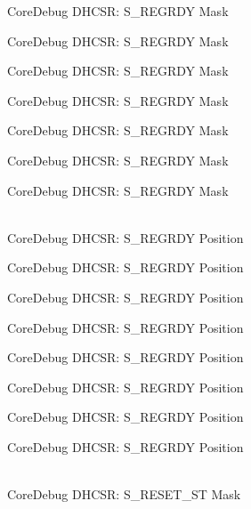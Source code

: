 \begin{DoxyRefList}
\label{deprecated__deprecated000120}%
%
Core\+Debug DHCSR:\+ S\+\_\+\+REGRDY Mask 

\label{deprecated__deprecated000174}%
%
Core\+Debug DHCSR:\+ S\+\_\+\+REGRDY Mask 

\label{deprecated__deprecated000259}%
%
Core\+Debug DHCSR:\+ S\+\_\+\+REGRDY Mask 

\label{deprecated__deprecated000316}%
%
Core\+Debug DHCSR:\+ S\+\_\+\+REGRDY Mask 

\label{deprecated__deprecated000392}%
%
Core\+Debug DHCSR:\+ S\+\_\+\+REGRDY Mask 

\label{deprecated__deprecated000479}%
%
Core\+Debug DHCSR:\+ S\+\_\+\+REGRDY Mask 

\label{deprecated__deprecated000581}%
%
Core\+Debug DHCSR:\+ S\+\_\+\+REGRDY Mask  
\item[{\parbox[t]{\linewidth}{Global \doxylink{group__CMSIS__CoreDebug_ga20a71871ca8768019c51168c70c3f41d}{Core\+Debug\+\_\+\+DHCSR\+\_\+\+S\+\_\+\+REGRDY\+\_\+\+Pos} }}]\hfill \\
\label{deprecated__deprecated000027}%
%
Core\+Debug DHCSR:\+ S\+\_\+\+REGRDY Position 

\label{deprecated__deprecated000119}%
%
Core\+Debug DHCSR:\+ S\+\_\+\+REGRDY Position 

\label{deprecated__deprecated000173}%
%
Core\+Debug DHCSR:\+ S\+\_\+\+REGRDY Position 

\label{deprecated__deprecated000258}%
%
Core\+Debug DHCSR:\+ S\+\_\+\+REGRDY Position 

\label{deprecated__deprecated000315}%
%
Core\+Debug DHCSR:\+ S\+\_\+\+REGRDY Position 

\label{deprecated__deprecated000391}%
%
Core\+Debug DHCSR:\+ S\+\_\+\+REGRDY Position 

\label{deprecated__deprecated000478}%
%
Core\+Debug DHCSR:\+ S\+\_\+\+REGRDY Position 

\label{deprecated__deprecated000580}%
%
Core\+Debug DHCSR:\+ S\+\_\+\+REGRDY Position  
\item[{\parbox[t]{\linewidth}{Global \doxylink{group__CMSIS__CoreDebug_gac474394bcceb31a8e09566c90b3f8922}{Core\+Debug\+\_\+\+DHCSR\+\_\+\+S\+\_\+\+RESET\+\_\+\+ST\+\_\+\+Msk} }}]\hfill \\
\label{deprecated__deprecated000010}%
%
Core\+Debug DHCSR:\+ S\+\_\+\+RESET\+\_\+\+ST Mask 


\end{DoxyRefList}
